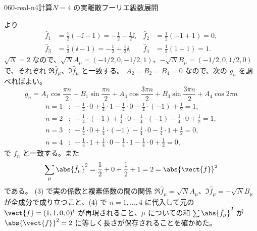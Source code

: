 \documentclass[uplatex,dvipdfmx,a4paper,11pt]{jsarticle}
\begin{document}
\begin{mondai}{060-real-n4}{計算}{$N=4$ の実離散フーリエ級数展開}
\begin{tadashii}
\[\]
より
\begin{align*}
\hat{f}_1&=\tfrac{1}{2}(-\ii-1)=-\tfrac{1}{2}-\tfrac{1}{2}\ii, & \hat{f}_2&=\tfrac{1}{2}(-1+1)=0,\\
\hat{f}_3&=\tfrac{1}{2}(\ii-1)=-\tfrac{1}{2}+\tfrac{1}{2}\ii, & \hat{f}_4&=\tfrac{1}{2}(1+1)=1.
\end{align*}
$\sqrt{N}=2$ なので、$\sqrt{N}A_{\mu}=(-1/2,0,-1/2,1)$、$-\sqrt{N}B_{\mu}=(-1/2,0,1/2,0)$ で、それぞれ $\Re\hat{f}_{\mu}$、$\Im\hat{f}_{\mu}$ と一致する。
 $A_2=B_2=B_4=0$ なので、次の $g_n$ を調べればよい。
\[
g_n=A_1\cos\frac{\pi n}{2}+B_1\sin\frac{\pi n}{2}+A_3\cos\frac{3\pi n}{2}+B_3\sin\frac{3\pi n}{2}+A_4\cos2\pi n
\]
\begin{align*}
n=1&:\ -\tfrac{1}{4}\cdot0+\tfrac{1}{4}\cdot1-\tfrac{1}{4}\cdot0-\tfrac{1}{4}\cdot(-1)+\tfrac{1}{2}=1,\\
n=2&:\ -\tfrac{1}{4}\cdot(-1)+\tfrac{1}{4}\cdot0-\tfrac{1}{4}\cdot(-1)-\tfrac{1}{4}\cdot0+\tfrac{1}{2}=1,\\
n=3&:\ -\tfrac{1}{4}\cdot0+\tfrac{1}{4}\cdot(-1)-\tfrac{1}{4}\cdot0-\tfrac{1}{4}\cdot1+\tfrac{1}{2}=0,\\
n=4&:\ -\tfrac{1}{4}\cdot1+\tfrac{1}{4}\cdot0-\tfrac{1}{4}\cdot1-\tfrac{1}{4}\cdot0+\tfrac{1}{2}=0,
\end{align*}
で $f_n$ と一致する。また
\[
\sum_{\mu}\abs{\hat{f}_{\mu}}^{2}=\frac{1}{2}+0+\frac{1}{2}+1=2=\abs{\vect{f}}^{2}
\]
である。
\kenzan (3) で実の係数と複素係数の間の関係 $\Re\hat{f}_{\mu}=\sqrt{N}A_{\mu}$、$\Im\hat{f}_{\mu}=-\sqrt{N}B_{\mu}$ が全成分で成り立つこと、(4) で $n=1,\dots,4$ に代入して元の $\vect{f}=(1,1,0,0)^{t}$ が再現されること、$\mu$ についての和 $\sum\abs{\hat{f}_{\mu}}^{2}$ が $\abs{\vect{f}}^{2}=2$ に等しく長さが保存されることを確かめた。
\end{tadashii}
\end{mondai}
\end{document}
